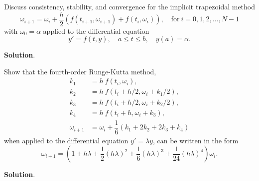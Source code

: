 \documentclass[11pt]{article}
\theoremstyle{break}
\numberwithin{equation}{theorem}
\begin{document}
\newpage
\begin{problem}\label{problem 18} %
    Discuss consistency, stability, and convergence for the implicit trapezoidal method $$\omega_{i+1}=\omega_i+\dfrac{h}{2}\left(f(t_{i+1}, \omega_{i+1})+f(t_i, \omega_i)\right),\quad \text{for}\ i=0,1,2,\dots, N-1$$ with $\omega_0=\alpha$ applied to the differential equation $$y'=f(t, y), \quad a\leq t\leq b, \quad y(a)=\alpha.$$
\end{problem}
\textbf{Solution}.


\newpage
\begin{problem}\label{problem 19} %
    Show that the fourth-order Runge-Kutta method, 
    \begin{align*}
        k_1&=h\:f(t_i, \omega_i),\\
        k_2&=h\:f(t_i+h/2, \omega_i+k_1/2),\\
        k_3&=h\:f(t_i+h/2, \omega_i+k_2/2),\\
        k_4&=h\:f(t_i+h, \omega_i+k_3),\\
        \omega_{i+1}&=\omega_{i}+\dfrac{1}{6}\left(k_1+2k_2+2k_3+k_4\right)
    \end{align*}
    when applied to the differential equation $y'=\lambda y$, can be written in the form $$\omega_{i+1}=\left(1+h\lambda+\dfrac{1}{2}(h\lambda)^2+\dfrac{1}{6}(h\lambda)^3+\dfrac{1}{24}(h\lambda)^4\right)\omega_{i}.$$
\end{problem}
\textbf{Solution}.
\end{document}
